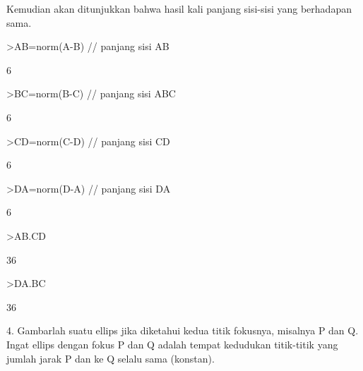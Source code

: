 \documentclass{article}
\begin{document}
\begin{eulernotebook}
\begin{eulercomment}
\begin{eulercomment}
\begin{eulercomment}
\begin{eulercomment}
\begin{eulercomment}
\begin{eulercomment}
\begin{eulercomment}
\begin{eulercomment}
\begin{eulercomment}
Kemudian akan ditunjukkan bahwa hasil kali panjang sisi-sisi yang
berhadapan sama.
\end{eulercomment}
\begin{eulerprompt}
>AB=norm(A-B) // panjang sisi AB
\end{eulerprompt}
\begin{euleroutput}
  6
\end{euleroutput}
\begin{eulerprompt}
>BC=norm(B-C) // panjang sisi ABC
\end{eulerprompt}
\begin{euleroutput}
  6
\end{euleroutput}
\begin{eulerprompt}
>CD=norm(C-D) // panjang sisi CD
\end{eulerprompt}
\begin{euleroutput}
  6
\end{euleroutput}
\begin{eulerprompt}
>DA=norm(D-A) // panjang sisi DA
\end{eulerprompt}
\begin{euleroutput}
  6
\end{euleroutput}
\begin{eulerprompt}
>AB.CD
\end{eulerprompt}
\begin{euleroutput}
  36
\end{euleroutput}
\begin{eulerprompt}
>DA.BC
\end{eulerprompt}
\begin{euleroutput}
  36
\end{euleroutput}
\begin{eulercomment}
4. Gambarlah suatu ellips jika diketahui kedua titik fokusnya,
misalnya P dan Q. Ingat ellips dengan fokus P dan Q adalah tempat
kedudukan titik-titik yang jumlah jarak P dan ke Q selalu sama
(konstan). 


\end{eulercomment}
\end{eulercomment}
\end{eulercomment}
\end{eulercomment}
\end{eulercomment}
\end{eulercomment}
\end{eulercomment}
\end{eulercomment}
\end{eulercomment}
\end{eulernotebook}
\end{document}
